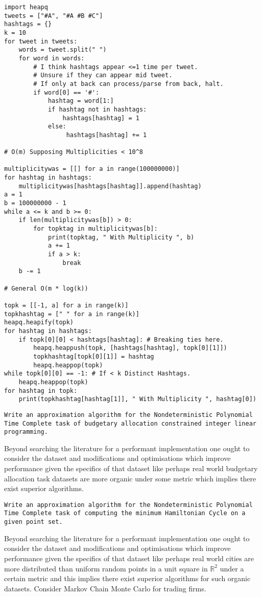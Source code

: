 \begin{verbatim}
import heapq
tweets = ["#A", "#A #B #C"]
hashtags = {}
k = 10
for tweet in tweets:
    words = tweet.split(" ")
    for word in words:
        # I think hashtags appear <=1 time per tweet.
        # Unsure if they can appear mid tweet.
        # If only at back can process/parse from back, halt.
        if word[0] == '#':
            hashtag = word[1:]
            if hashtag not in hashtags:
                hashtags[hashtag] = 1
            else:
                 hashtags[hashtag] += 1

# O(m) Supposing Multiplicities < 10^8

multiplicitywas = [[] for a in range(100000000)]
for hashtag in hashtags:
    multiplicitywas[hashtags[hashtag]].append(hashtag)
a = 1
b = 100000000 - 1
while a <= k and b >= 0:
	if len(multiplicitywas[b]) > 0:
        for topktag in multiplicitywas[b]:
            print(topktag, " With Multiplicity ", b)
            a += 1
            if a > k:
                break
    b -= 1

# General O(m * log(k))

topk = [[-1, a] for a in range(k)]
topkhashtag = [" " for a in range(k)]
heapq.heapify(topk)
for hashtag in hashtags:
    if topk[0][0] < hashtags[hashtag]: # Breaking ties here.
        heapq.heappush(topk, [hashtags[hashtag], topk[0][1]])
        topkhashtag[topk[0][1]] = hashtag
        heapq.heappop(topk)
while topk[0][0] == -1: # If < k Distinct Hashtags.
    heapq.heappop(topk)
for hashtag in topk:
    print(topkhashtag[hashtag[1]], " With Multiplicity ", hashtag[0])
\end{verbatim}

\texttt{Write an approximation algorithm for the Nondeterministic Polynomial Time Complete task of budgetary allocation constrained integer linear programming.}

Beyond searching the literature for a performant implementation one ought to consider the dataset and modifications and optimisations which improve performance given the specifics of that dataset like perhaps real world budgetary allocation task datasets are more organic under some metric which implies there exist superior algorithms.

\texttt{Write an approximation algorithm for the Nondeterministic Polynomial Time Complete task of computing the minimum Hamiltonian Cycle on a given point set.}

Beyond searching the literature for a performant implementation one ought to consider the dataset and modifications and optimisations which improve performance given the specifics of that dataset like perhaps real world cities are more distributed than uniform random points in a unit square in $\mathbb{R}^2$ under a certain metric and this implies there exist superior algorithms for such organic datasets. Consider Markov Chain Monte Carlo for trading firms.


